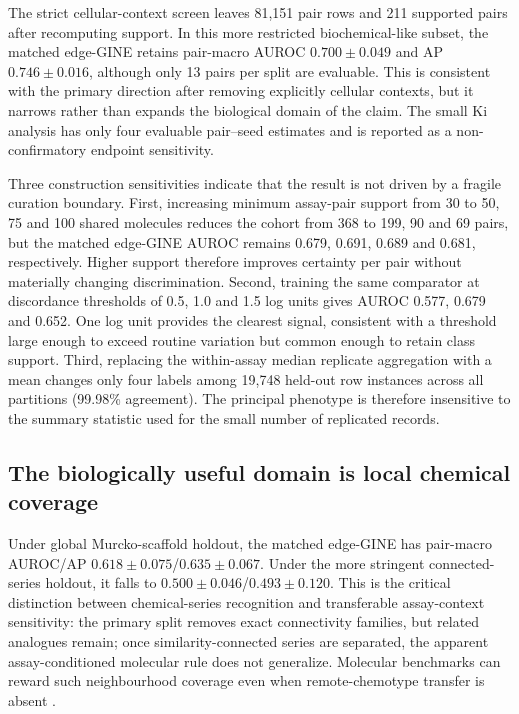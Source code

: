 \documentclass[letterpaper]{article}
\begin{document}
The strict cellular-context screen leaves 81,151 pair rows and 211 supported pairs after recomputing support. In this more restricted biochemical-like subset, the matched edge-GINE retains pair-macro AUROC $0.700\pm0.049$ and AP $0.746\pm0.016$, although only 13 pairs per split are evaluable. This is consistent with the primary direction after removing explicitly cellular contexts, but it narrows rather than expands the biological domain of the claim. The small Ki analysis has only four evaluable pair--seed estimates and is reported as a non-confirmatory endpoint sensitivity.

Three construction sensitivities indicate that the result is not driven by a fragile curation boundary. First, increasing minimum assay-pair support from 30 to 50, 75 and 100 shared molecules reduces the cohort from 368 to 199, 90 and 69 pairs, but the matched edge-GINE AUROC remains 0.679, 0.691, 0.689 and 0.681, respectively. Higher support therefore improves certainty per pair without materially changing discrimination. Second, training the same comparator at discordance thresholds of 0.5, 1.0 and 1.5 log units gives AUROC 0.577, 0.679 and 0.652. One log unit provides the clearest signal, consistent with a threshold large enough to exceed routine variation but common enough to retain class support. Third, replacing the within-assay median replicate aggregation with a mean changes only four labels among 19,748 held-out row instances across all partitions (99.98\% agreement). The principal phenotype is therefore insensitive to the summary statistic used for the small number of replicated records.

\subsection{The biologically useful domain is local chemical coverage}

Under global Murcko-scaffold holdout, the matched edge-GINE has pair-macro AUROC/AP $0.618\pm0.075$/$0.635\pm0.067$. Under the more stringent connected-series holdout, it falls to $0.500\pm0.046$/$0.493\pm0.120$. This is the critical distinction between chemical-series recognition and transferable assay-context sensitivity: the primary split removes exact connectivity families, but related analogues remain; once similarity-connected series are separated, the apparent assay-conditioned molecular rule does not generalize. Molecular benchmarks can reward such neighbourhood coverage even when remote-chemotype transfer is absent \citep{wallach2018memorization,liu2019domain}.
\end{document}

